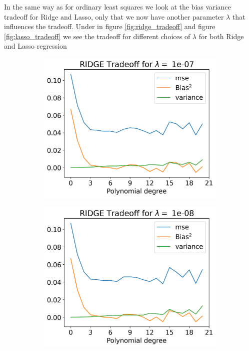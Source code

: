 \documentclass[12pt]{article}
\begin{document}
In the same way as for ordinary least squares we look at the bias variance tradeoff for Ridge and Lasso, only that we now have another parameter $\lambda$ that influences the tradeoff. Under in figure \ref{fig:ridge_tradeoff} and figure \ref{fig:lasso_tradeoff} we see the tradeoff for different choices of $\lambda$ for both Ridge and Lasso regression
\begin{figure}[H]
  \begin{subfigure}{.5\textwidth}
    \centering
    \includegraphics[width=\textwidth]{../figures/tradeoff_RIDGE_1e-07_20.png}
    \caption{}
    \label{fig:l_1e-07}
  \end{subfigure}
  \begin{subfigure}{.5\textwidth}
    \centering
    \includegraphics[width=\textwidth]{../figures/tradeoff_RIDGE_1e-08_20.png}

\end{subfigure}
\end{figure}
\end{document}
